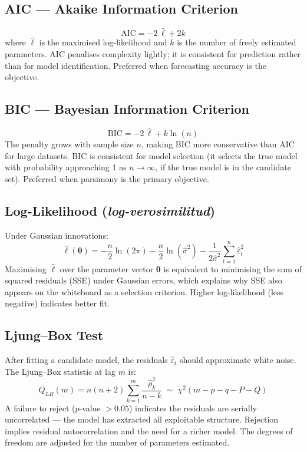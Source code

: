 \documentclass[12pt,a4paper]{article}
\begin{document}
\subsection{AIC — Akaike Information Criterion}

\[
    \text{AIC} = -2\,\hat{\ell} + 2k
\]
where $\hat{\ell}$ is the maximised log-likelihood and $k$ is the number of
freely estimated parameters. AIC penalises complexity lightly; it is consistent
for prediction rather than for model identification. Preferred when forecasting
accuracy is the objective.

\subsection{BIC — Bayesian Information Criterion}

\[
    \text{BIC} = -2\,\hat{\ell} + k\ln(n)
\]
The penalty grows with sample size $n$, making BIC more conservative than AIC
for large datasets. BIC is consistent for model selection (it selects the true
model with probability approaching 1 as $n\to\infty$, if the true model is in
the candidate set). Preferred when parsimony is the primary objective.

\subsection{Log-Likelihood (\textit{log-verosimilitud})}

Under Gaussian innovations:
\[
    \hat{\ell}(\boldsymbol{\theta}) = -\frac{n}{2}\ln(2\pi) - \frac{n}{2}\ln(\hat{\sigma}^2)
    - \frac{1}{2\hat{\sigma}^2}\sum_{t=1}^n \hat{\varepsilon}_t^2
\]
Maximising $\hat{\ell}$ over the parameter vector $\boldsymbol{\theta}$ is
equivalent to minimising the sum of squared residuals (SSE) under Gaussian
errors, which explains why SSE also appears on the whiteboard as a selection
criterion. Higher log-likelihood (less negative) indicates better fit.

\subsection{Ljung--Box Test}

After fitting a candidate model, the residuals $\hat{\varepsilon}_t$ should
approximate white noise. The Ljung--Box statistic at lag $m$ is:
\[
    Q_{LB}(m) = n(n+2)\sum_{k=1}^m \frac{\hat{\rho}_k^2}{n-k}
    \;\sim\;\chi^2(m - p - q - P - Q)
\]
A failure to reject ($p$-value $> 0.05$) indicates the residuals are
serially uncorrelated — the model has extracted all exploitable structure.
Rejection implies residual autocorrelation and the need for a richer model.
The degrees of freedom are adjusted for the number of parameters estimated.
\end{document}
